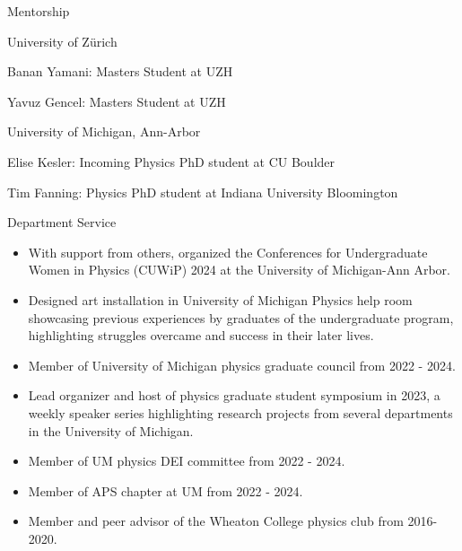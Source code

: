 \documentclass{resume} %
\begin{document}


\begin{rSection}{Mentorship}
\begin{rSubsection}{University of Zürich}{}{}{}
    \item Banan Yamani: Masters Student at UZH
    \item Yavuz Gencel: Masters Student at UZH
\end{rSubsection}

\begin{rSubsection}{University of Michigan, Ann-Arbor}{}{}{}
    \item Elise Kesler: Incoming Physics PhD student at CU Boulder
    \item Tim Fanning: Physics PhD student at Indiana University Bloomington
\end{rSubsection}

\end{rSection}



\begin{rSection}{Department Service}
    \begin{itemize}
        \item With support from others, organized the Conferences for Undergraduate Women in Physics (CUWiP) 2024 at the University of Michigan-Ann Arbor.
        \item Designed art installation in University of Michigan Physics help room showcasing previous experiences by graduates of the undergraduate program, highlighting struggles overcame and success in their later lives.
        \item Member of University of Michigan physics graduate council from 2022 - 2024. 
        \item Lead organizer and host of physics graduate student symposium in 2023, a weekly speaker series highlighting research projects from several departments in the University of Michigan.
    	\item Member of UM physics DEI committee from 2022 - 2024.
	\item Member of APS chapter at UM from 2022 - 2024.
        \item Member and peer advisor of the Wheaton College physics club from 2016-2020.
    \end{itemize}
\end{rSection}

%
\end{document}
